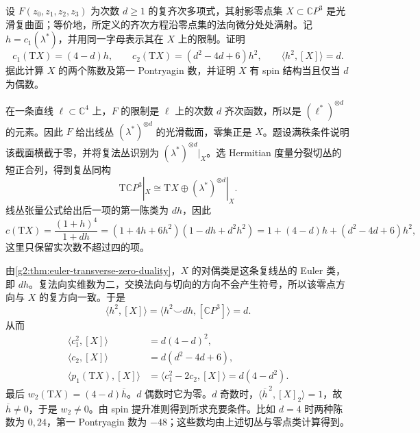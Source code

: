 \begin{exercise}\label{g2:ex:smooth-projective-surface-numbers}
	设 \(F(z_0,z_1,z_2,z_3)\) 为次数 \(d\ge1\) 的复齐次多项式，其射影零点集 \(X\subset\mathbb CP^3\) 是光滑复曲面；等价地，所定义的齐次方程沿零点集的法向微分处处满射。记 \(h=c_1(\lambda^*)\)，并用同一字母表示其在 \(X\) 上的限制。证明
	\[
		c_1(\mathrm TX)=(4-d)h,\qquad
		c_2(\mathrm TX)=(d^2-4d+6)h^2,\qquad
		\langle h^2,[X]\rangle=d.
	\]
	据此计算 \(X\) 的两个陈数及第一 Pontryagin 数，并证明 \(X\) 有 spin 结构当且仅当 \(d\) 为偶数。
\end{exercise}
\begin{solution}
	在一条直线 \(\ell\subset\mathbb C^4\) 上，\(F\) 的限制是 \(\ell\) 上的次数 \(d\) 齐次函数，所以是 \((\ell^*)^{\otimes d}\) 的元素。因此 \(F\) 给出线丛 \((\lambda^*)^{\otimes d}\) 的光滑截面，零集正是 \(X\)。题设满秩条件说明该截面横截于零，并将复法丛识别为 \((\lambda^*)^{\otimes d}|_X\)。选 Hermitian 度量分裂切丛的短正合列，得到复丛同构
	\[
		\mathrm T\mathbb CP^3|_X\cong\mathrm TX\oplus(\lambda^*)^{\otimes d}|_X.
	\]
	线丛张量公式给出后一项的第一陈类为 \(dh\)，因此
	\[
		c(\mathrm TX)=\frac{(1+h)^4}{1+dh}
		=(1+4h+6h^2)(1-dh+d^2h^2)
		=1+(4-d)h+(d^2-4d+6)h^2,
	\]
	这里只保留实次数不超过四的项。

	由\cref{g2:thm:euler-transverse-zero-duality}，\(X\) 的对偶类是这条复线丛的 Euler 类，即 \(dh\)。复法向实维数为二，交换法向与切向的方向不会产生符号，所以该零点方向与 \(X\) 的复方向一致。于是
	\[
		\langle h^2,[X]\rangle=\langle h^2\smile dh,[\mathbb CP^3]\rangle=d.
	\]
	从而
	\[
	\begin{aligned}
		\langle c_1^2,[X]\rangle&=d(4-d)^2,\\
		\langle c_2,[X]\rangle&=d(d^2-4d+6),\\
		\langle p_1(\mathrm TX),[X]\rangle&=\langle c_1^2-2c_2,[X]\rangle=d(4-d^2).
	\end{aligned}
	\]
	最后 \(w_2(\mathrm TX)=(4-d)\overline h\)。\(d\) 偶数时它为零。\(d\) 奇数时，\(\langle\overline h^{\,2},[X]_2\rangle=1\)，故 \(\overline h\ne0\)，于是 \(w_2\ne0\)。由 spin 提升准则得到所求充要条件。比如 \(d=4\) 时两种陈数为 \(0,24\)，第一 Pontryagin 数为 \(-48\)；这些数均由上述切丛与零点类计算得到。
\end{solution}

